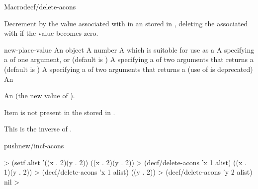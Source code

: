 \documentclass[10pt,twoside,english,pdftex]{article}
\begin{document}

\begin{functiondoc}{Macro}{decf/delete-acons}{%
    }
%
%
%
%
  
\fnsyntax

\fnpurpose Decrement by  the value associated with
 in an  stored in , deleting
the  associated with  if the value becomes zero.

\fnpackage {}

\fnmodule {}

\fnargs
\begin{args}{new-place-value}
\arg[item] An object
\arg[decrement] A number
\arg[place] A  which is suitable for use as a
\arg[key] A  specifying a 
of one argument, or \nil{} (default is \nil)
\arg[test] A  specifying a 
of two arguments that returns a  (default is
)
 A  specifying a
 of two arguments that returns a
 (use of  is deprecated)
 An  
\end{args}

\fnreturns An  (the new value of ). 

\fnerrors Item  is not present in the 
stored in .

\fndescription
This is the inverse of .

\begin{alsos}{pushnew/incf-acons}
\end{alsos}

\fnexamples
%
\W\supp
\begin{example}
  > (setf alist '((x . 2)(y . 2))
  ((x . 2)(y . 2))
  > (decf/delete-acons 'x 1 alist)
  ((x . 1)(y . 2))
  > (decf/delete-acons 'x 1 alist)
  ((y . 2))\goodpagebreak
  > (decf/delete-acons 'y 2 alist)
  nil
  >
\end{example}


\end{functiondoc}
\end{document}
